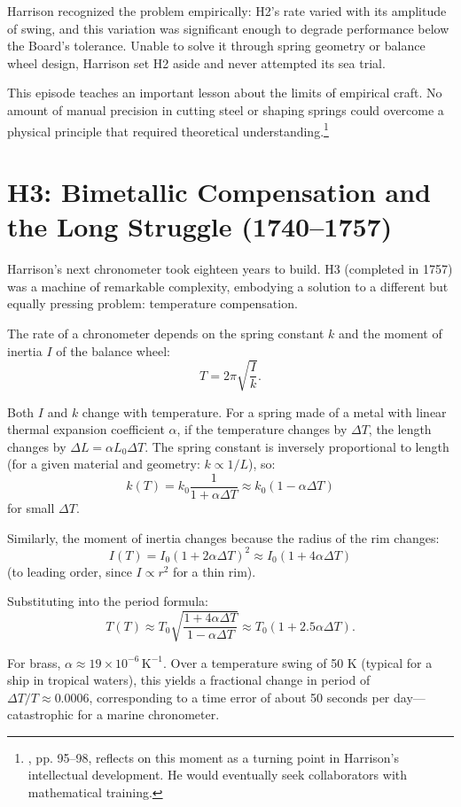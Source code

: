 Harrison recognized the problem empirically: H2's rate varied with its amplitude of swing, and this variation was significant enough to degrade performance below the Board's tolerance. Unable to solve it through spring geometry or balance wheel design, Harrison set H2 aside and never attempted its sea trial.

This episode teaches an important lesson about the limits of empirical craft. No amount of manual precision in cutting steel or shaping springs could overcome a physical principle that required theoretical understanding.\footnote{\textcite{Landes1983}, pp. 95--98, reflects on this moment as a turning point in Harrison's intellectual development. He would eventually seek collaborators with mathematical training.}

\section{H3: Bimetallic Compensation and the Long Struggle (1740--1757)}

Harrison's next chronometer took eighteen years to build. H3 (completed in 1757) was a machine of remarkable complexity, embodying a solution to a different but equally pressing problem: temperature compensation.

The rate of a chronometer depends on the spring constant $k$ and the moment of inertia $I$ of the balance wheel:
\[
  T = 2\pi\sqrt{\frac{I}{k}}.
\]

Both $I$ and $k$ change with temperature. For a spring made of a metal with linear thermal expansion coefficient $\alpha$, if the temperature changes by $\Delta T$, the length changes by $\Delta L = \alpha L_0 \Delta T$. The spring constant is inversely proportional to length (for a given material and geometry: $k \propto 1/L$), so:
\[
  k(T) = k_0 \frac{1}{1 + \alpha \Delta T} \approx k_0(1 - \alpha \Delta T)
\]
for small $\Delta T$.

Similarly, the moment of inertia changes because the radius of the rim changes:
\[
  I(T) = I_0(1 + 2\alpha \Delta T)^2 \approx I_0(1 + 4\alpha \Delta T)
\]
(to leading order, since $I \propto r^2$ for a thin rim).

Substituting into the period formula:
\[
  T(T) \approx T_0 \sqrt{\frac{1 + 4\alpha \Delta T}{1 - \alpha \Delta T}} \approx T_0 (1 + 2.5 \alpha \Delta T).
\]

For brass, $\alpha \approx 19 \times 10^{-6} \, \text{K}^{-1}$. Over a temperature swing of 50 K (typical for a ship in tropical waters), this yields a fractional change in period of $\Delta T / T \approx 0.0006$, corresponding to a time error of about 50 seconds per day—catastrophic for a marine chronometer.

